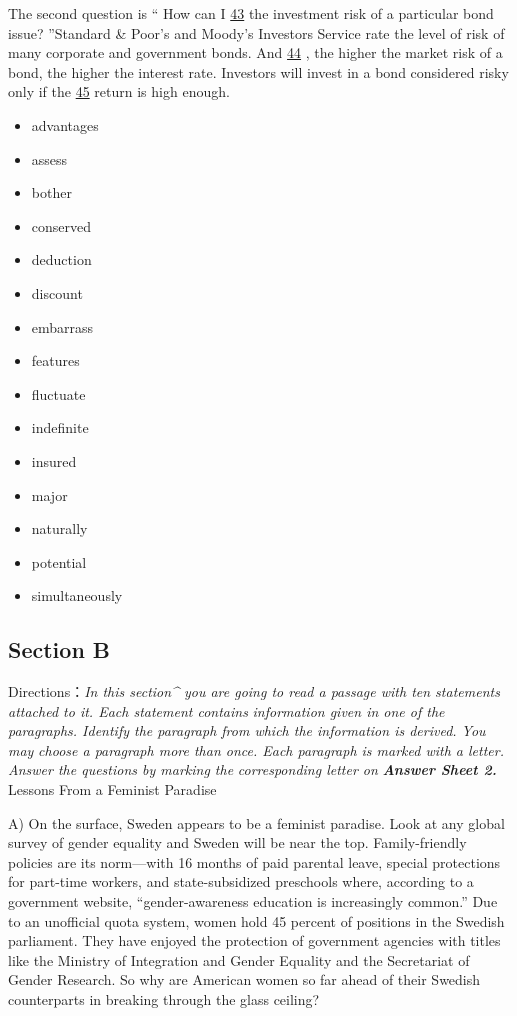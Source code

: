\documentclass[UTF8,11pt]{ctexart}
\begin{document}
The second question is “ How can I \uline{43} the investment risk of a particular bond issue? ”Standard \& Poor’s and Moody’s Investors Service rate the level of risk of many corporate and government bonds. And \uline{44} , the higher the market risk of a bond, the higher the interest rate. Investors will invest in a bond considered risky only if the \uline{45} return is high enough.




\begin{itemize}[leftmargin=2em,itemsep=.2em,topsep=.4em]\item[A.] advantages
\item[B.] assess
\item[C.] bother
\item[D.] conserved
\item[E.] deduction
\item[F.] discount
\item[G.] embarrass
\item[H.] features
\item[I.] fluctuate
\item[J.] indefinite
\item[K.] insured
\item[L.] major
\item[M.] naturally
\item[N.] potential
\item[O.] simultaneously
\end{itemize}

\subsection*{\textbf{Section B}}


Directions：\textit{In this section\textasciicircum{} you are going to read a passage with ten statements attached to it. Each statement contains} \textit{information given in one of the paragraphs. Identify the paragraph from which the information is derived. You may} \textit{choose a paragraph more than once. Each paragraph is marked with a letter. Answer the questions by marking the} \textit{corresponding letter on}\textbf{\textit{ Answer Sheet 2.}} Lessons From a Feminist Paradise


A) On the surface, Sweden appears to be a feminist paradise. Look at any global survey of gender equality and Sweden will be near the top. Family-friendly policies are its norm—with 16 months of paid parental leave, special protections for part-time workers, and state-subsidized preschools where, according to a government website, “gender-awareness education is increasingly common.” Due to an unofficial quota system, women hold 45 percent of positions in the Swedish parliament. They have enjoyed the protection of government agencies with titles like the Ministry of Integration and Gender Equality and the Secretariat of Gender Research. So why are American women so far ahead of their Swedish counterparts in breaking through the glass ceiling?
\end{document}
